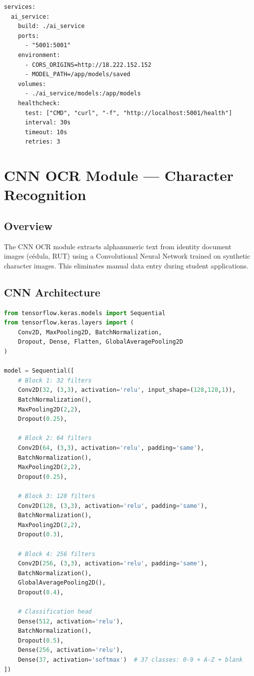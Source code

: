\documentclass[12pt,a4paper]{report}
\begin{document}
\begin{lstlisting}[caption={docker-compose.yml excerpt}]
services:
  ai_service:
    build: ./ai_service
    ports:
      - "5001:5001"
    environment:
      - CORS_ORIGINS=http://18.222.152.152
      - MODEL_PATH=/app/models/saved
    volumes:
      - ./ai_service/models:/app/models
    healthcheck:
      test: ["CMD", "curl", "-f", "http://localhost:5001/health"]
      interval: 30s
      timeout: 10s
      retries: 3
\end{lstlisting}

\chapter{CNN OCR Module — Character Recognition}

\section{Overview}

The CNN OCR module extracts alphanumeric text from identity document images (cédula, RUT) using a Convolutional Neural Network trained on synthetic character images. This eliminates manual data entry during student applications.

\section{CNN Architecture}

\begin{lstlisting}[language=Python, caption={CNN OCR Model Architecture (TensorFlow/Keras)}]
from tensorflow.keras.models import Sequential
from tensorflow.keras.layers import (
    Conv2D, MaxPooling2D, BatchNormalization,
    Dropout, Dense, Flatten, GlobalAveragePooling2D
)

model = Sequential([
    # Block 1: 32 filters
    Conv2D(32, (3,3), activation='relu', input_shape=(128,128,1)),
    BatchNormalization(),
    MaxPooling2D(2,2),
    Dropout(0.25),

    # Block 2: 64 filters
    Conv2D(64, (3,3), activation='relu', padding='same'),
    BatchNormalization(),
    MaxPooling2D(2,2),
    Dropout(0.25),

    # Block 3: 128 filters
    Conv2D(128, (3,3), activation='relu', padding='same'),
    BatchNormalization(),
    MaxPooling2D(2,2),
    Dropout(0.3),

    # Block 4: 256 filters
    Conv2D(256, (3,3), activation='relu', padding='same'),
    BatchNormalization(),
    GlobalAveragePooling2D(),
    Dropout(0.4),

    # Classification head
    Dense(512, activation='relu'),
    BatchNormalization(),
    Dropout(0.5),
    Dense(256, activation='relu'),
    Dense(37, activation='softmax')  # 37 classes: 0-9 + A-Z + blank
])
\end{lstlisting}
\end{document}
